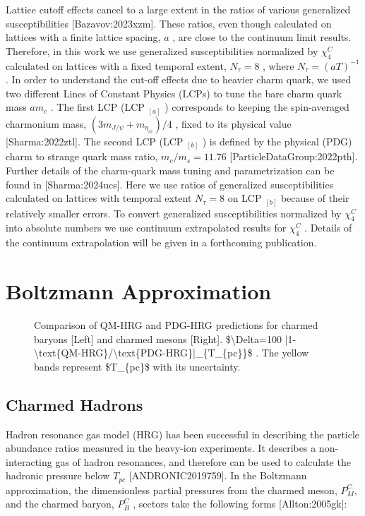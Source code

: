 \documentclass[11pt,a4paper]{article}
\begin{document}
Lattice cutoff effects cancel to a large extent in the ratios of various generalized susceptibilities  [Bazavov:2023xzm]. These ratios, even though calculated on lattices with a finite lattice spacing,  $a$ , are close to the continuum limit results.  Therefore, in this work we use generalized susceptibilities normalized by  $\chi^C_4$  calculated on lattices with a fixed temporal extent,  $N_\tau=8$ , where  $N_\tau=(aT)^{-1}$ .   In order to understand the cut-off effects due to heavier charm quark, we used two different Lines of Constant Physics (LCPs) to tune the bare charm quark mass  $am_c$ .  The first LCP (LCP $_{[a]}$ ) corresponds to keeping the spin-averaged charmonium mass,  ${(3m_{J/\psi}+m_{\eta_{c\bar{c}}})/4}$ , fixed to its physical value [Sharma:2022ztl]. The second LCP (LCP $_{[b]}$ )  is defined by the physical (PDG) charm to strange quark mass ratio,  $m_c/m_s=11.76$  [ParticleDataGroup:2022pth].  Further details of the charm-quark mass tuning and parametrization can be found in [Sharma:2024ucs]. Here we use ratios of generalized susceptibilities calculated on lattices with temporal extent  $N_\tau=8$  on LCP $_{[b]}$  because of their relatively smaller errors.  To convert generalized susceptibilities normalized by  $\chi^C_4$  into absolute numbers we use continuum extrapolated results for  $\chi^C_4$ . Details of the continuum extrapolation will be given in a forthcoming  publication.

\section{Boltzmann Approximation}

\begin{figure}[h]
\caption{Comparison of QM-HRG and PDG-HRG predictions for charmed baryons [Left] and charmed mesons [Right].  \$\textbackslash{}Delta=100 |1-\textbackslash{}text\{QM-HRG\}/\textbackslash{}text\{PDG-HRG\}|\_\{T\_\{pc\}\}\$ . The yellow bands represent  \$T\_\{pc\}\$  with its uncertainty.}
\end{figure}

\begin{figure}[h]
\end{figure}

\subsection{Charmed Hadrons}

Hadron resonance gas model (HRG) has been successful in describing the particle abundance ratios measured in the heavy-ion experiments. It describes a non-interacting gas of hadron resonances, and therefore can be used to calculate the hadronic pressure below  ${T_{pc}}$  [ANDRONIC2019759]. In the Boltzmann approximation, the dimensionless partial pressures from the charmed meson,  ${P^C_{M}},$   and the charmed baryon,  ${P^C_{B}}$ , sectors take the following forms [Allton:2005gk]:
\end{document}
